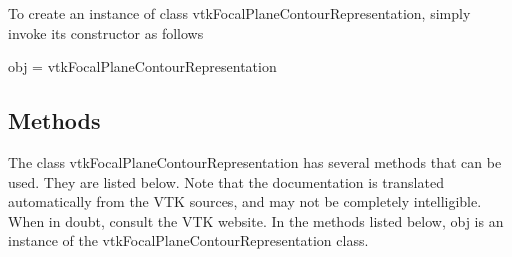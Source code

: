 To create an instance of class vtk\-Focal\-Plane\-Contour\-Representation, simply invoke its constructor as follows \begin{DoxyVerb}  obj = vtkFocalPlaneContourRepresentation
\end{DoxyVerb}
 \hypertarget{vtkwidgets_vtkxyplotwidget_Methods}{}\subsection{Methods}\label{vtkwidgets_vtkxyplotwidget_Methods}
The class vtk\-Focal\-Plane\-Contour\-Representation has several methods that can be used. They are listed below. Note that the documentation is translated automatically from the V\-T\-K sources, and may not be completely intelligible. When in doubt, consult the V\-T\-K website. In the methods listed below, {\ttfamily obj} is an instance of the vtk\-Focal\-Plane\-Contour\-Representation class. 
